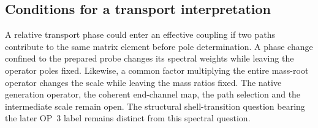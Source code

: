 \subsection{Conditions for a transport interpretation}

A relative transport phase could enter an effective coupling if two
paths contribute to the same matrix element before pole determination.
A phase change confined to the prepared probe changes its spectral
weights while leaving the operator poles fixed. Likewise, a common
factor multiplying the entire mass-root operator changes the scale
while leaving the mass ratios fixed. The native generation operator,
the coherent end-channel map, the path selection and the intermediate
scale remain open. The structural shell-transition question bearing the
later OP~3 label remains distinct from this spectral question.
